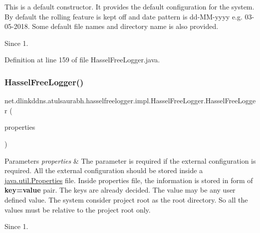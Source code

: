 This is a default constructor. It provides the default configuration for the system. By default the rolling feature is kept off and date pattern is dd-\/\+M\+M-\/yyyy e.\+g. 03-\/05-\/2018. Some default file names and directory name is also provided. \begin{DoxySince}{Since}
1. 
\end{DoxySince}


Definition at line 159 of file Hassel\+Free\+Logger.\+java.

\mbox{\label{classnet_1_1dlinkddns_1_1atulsaurabh_1_1hasselfreelogger_1_1impl_1_1_hassel_free_logger_a1210504fcaba4ae6c3283c0fc0882380}} 
\subsubsection{\texorpdfstring{Hassel\+Free\+Logger()}{HasselFreeLogger()}\hspace{0.1cm}{\footnotesize\ttfamily [2/2]}}
{\footnotesize\ttfamily net.\+dlinkddns.\+atulsaurabh.\+hasselfreelogger.\+impl.\+Hassel\+Free\+Logger.\+Hassel\+Free\+Logger (\begin{DoxyParamCaption}\item[{Properties}]{properties }\end{DoxyParamCaption})}


\begin{DoxyParams}{Parameters}
{\em properties} & The parameter is required if the external configuration is required. All the external configuration should be stored inside a \mbox{\hyperlink{}{java.\+util.\+Properties}} file. Inside properties file, the information is stored in form of {\bfseries key=value} pair. The keys are already decided. The value may be any user defined value. The system consider project root as the root directory. So all the values must be relative to the project root only. \\
\hline
\end{DoxyParams}
\begin{DoxySince}{Since}
1. 
\end{DoxySince}


